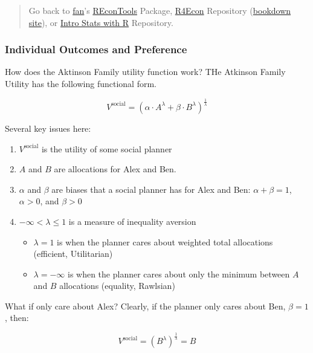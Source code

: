 \documentclass[
]{book}
\providecommand{\tightlist}{%
  \setlength{\itemsep}{0pt}\setlength{\parskip}{0pt}}
\begin{document}
\begin{quote}
Go back to \href{http://fanwangecon.github.io/}{fan}'s \href{https://fanwangecon.github.io/REconTools/}{REconTools} Package, \href{https://fanwangecon.github.io/R4Econ/}{R4Econ} Repository (\href{https://fanwangecon.github.io/R4Econ/bookdown}{bookdown site}), or \href{https://fanwangecon.github.io/Stat4Econ/}{Intro Stats with R} Repository.
\end{quote}

\hypertarget{individual-outcomes-and-preference}{%
\subsubsection{Individual Outcomes and Preference}\label{individual-outcomes-and-preference}}

How does the Aktinson Family utility function work? THe Atkinson Family Utility has the following functional form.

\[
V^{\text{social}}
=
\left(
\alpha
\cdot
A^{\lambda}
+
\beta
\cdot
B^{\lambda}
\right)^{\frac{1}{\lambda}}
\]

Several key issues here:

\begin{enumerate}
\def\labelenumi{\arabic{enumi}.}
\tightlist
\item
  \(V^{\text{social}}\) is the utility of some social planner
\item
  \(A\) and \(B\) are allocations for Alex and Ben.
\item
  \(\alpha\) and \(\beta\) are biases that a social planner has for Alex and Ben: \(\alpha+\beta=1\), \(\alpha>0\), and \(\beta>0\)
\item
  \(-\infty < \lambda \le 1\) is a measure of inequality aversion

  \begin{itemize}
  \tightlist
  \item
    \(\lambda=1\) is when the planner cares about weighted total allocations (efficient, Utilitarian)
  \item
    \(\lambda=-\infty\) is when the planner cares about only the minimum between \(A\) and \(B\) allocations (equality, Rawlsian)
  \end{itemize}
\end{enumerate}

What if only care about Alex? Clearly, if the planner only cares about Ben, \(\beta=1\), then:

\[
V^{\text{social}}
=
\left(
B^{\lambda}
\right)^{\frac{1}{\lambda}}
= B
\]
\end{document}
